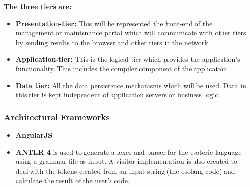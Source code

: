 \documentclass[english]{article}
\begin{document}
		\vspace{0.5cm}		
		
		\textbf{The three tiers are:}
			\begin{itemize}
			\item \textbf{Presentation-tier:} This will be represented the front-end of the management or maintenance portal which will communicate with other tiers by sending results to the browser and other tiers in the network.
			\item \textbf{Application-tier:} This is the logical tier which provides the application's functionality. This includes the compiler component of the application.	
			\item \textbf{Data tier:} All the data persistence mechanisms which will be used. Data in this tier is kept independent of application servers or business logic. 	
			\end{itemize}	
			
			\vspace{0.5cm}
			
		\fi

	\subsubsection{Architectural Frameworks} %

	\begin{itemize}
		\item \textbf{AngularJS}
		
		\item \textbf{ANTLR 4} is used to generate a lexer and parser for the esoteric language using a grammar file as input. A visitor implementation is also created to deal with the tokens created from an input string (the esolang code) and calculate the result of the user's code.
	\end{itemize}	
	

	
\end{document}
